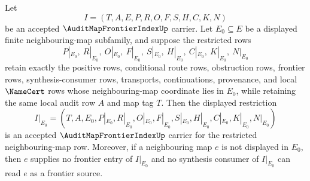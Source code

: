 \begin{theorem}
\label{thm:audit-map-frontier-index-neighbour-restriction}
Let
$$
I=(T,A,E,P,R,O,F,S,H,C,K,N)
$$
be an accepted $\AuditMapFrontierIndexUp$ carrier. Let $E_0\subseteq E$ be a displayed finite neighbouring-map subfamily, and suppose the restricted rows
$$
P|_{E_0},\ R|_{E_0},\ O|_{E_0},\ F|_{E_0},\ S|_{E_0},\ H|_{E_0},\ C|_{E_0},\ K|_{E_0},\ N|_{E_0}
$$
retain exactly the positive rows, conditional route rows, obstruction rows, frontier rows, synthesis-consumer rows, transports, continuations, provenance, and local $\NameCert$ rows whose neighbouring-map coordinate lies in $E_0$, while retaining the same local audit row $A$ and map tag $T$. Then the displayed restriction
$$
I|_{E_0}=(T,A,E_0,P|_{E_0},R|_{E_0},O|_{E_0},F|_{E_0},S|_{E_0},H|_{E_0},C|_{E_0},K|_{E_0},N|_{E_0})
$$
is an accepted $\AuditMapFrontierIndexUp$ carrier for the restricted neighbouring-map row. Moreover, if a neighbouring map $e$ is not displayed in $E_0$, then $e$ supplies no frontier entry of $I|_{E_0}$ and no synthesis consumer of $I|_{E_0}$ can read $e$ as a frontier source.
\end{theorem}

